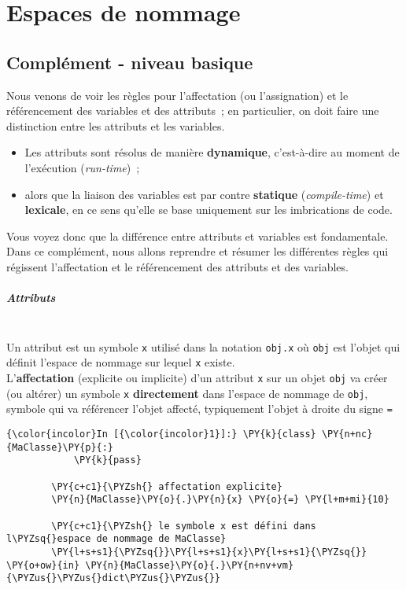     \hypertarget{espaces-de-nommage}{%
\section{Espaces de nommage}\label{espaces-de-nommage}}

    \hypertarget{compluxe9ment---niveau-basique}{%
\subsection{Complément - niveau
basique}\label{compluxe9ment---niveau-basique}}

    Nous venons de voir les règles pour l'affectation (ou l'assignation) et
le référencement des variables et des attributs~; en particulier, on
doit faire une distinction entre les attributs et les variables.

    \begin{itemize}
\tightlist
\item
  Les attributs sont résolus de manière \textbf{dynamique}, c'est-à-dire
  au moment de l'exécution (\emph{run-time})~;
\item
  alors que la liaison des variables est par contre \textbf{statique}
  (\emph{compile-time}) et \textbf{lexicale}, en ce sens qu'elle se base
  uniquement sur les imbrications de code.
\end{itemize}

    Vous voyez donc que la différence entre attributs et variables est
fondamentale. Dans ce complément, nous allons reprendre et résumer les
différentes règles qui régissent l'affectation et le référencement des
attributs et des variables.

    \hypertarget{attributs}{%
\subparagraph{Attributs\\\\}\label{attributs}}

    Un attribut est un symbole \texttt{x} utilisé dans la notation
\texttt{obj.x} où \texttt{obj} est l'objet qui définit l'espace de
nommage sur lequel \texttt{x} existe.\\

L'\textbf{affectation} (explicite ou implicite) d'un attribut \texttt{x}
sur un objet \texttt{obj} va créer (ou altérer) un symbole \texttt{x}
\textbf{directement} dans l'espace de nommage de \texttt{obj}, symbole
qui va référencer l'objet affecté, typiquement l'objet à droite du signe
\texttt{=}

    \begin{Verbatim}[commandchars=\\\{\}]
{\color{incolor}In [{\color{incolor}1}]:} \PY{k}{class} \PY{n+nc}{MaClasse}\PY{p}{:}
            \PY{k}{pass}
        
        \PY{c+c1}{\PYZsh{} affectation explicite}
        \PY{n}{MaClasse}\PY{o}{.}\PY{n}{x} \PY{o}{=} \PY{l+m+mi}{10} 
        
        \PY{c+c1}{\PYZsh{} le symbole x est défini dans l\PYZsq{}espace de nommage de MaClasse}
        \PY{l+s+s1}{\PYZsq{}}\PY{l+s+s1}{x}\PY{l+s+s1}{\PYZsq{}} \PY{o+ow}{in} \PY{n}{MaClasse}\PY{o}{.}\PY{n+nv+vm}{\PYZus{}\PYZus{}dict\PYZus{}\PYZus{}}
\end{Verbatim}


